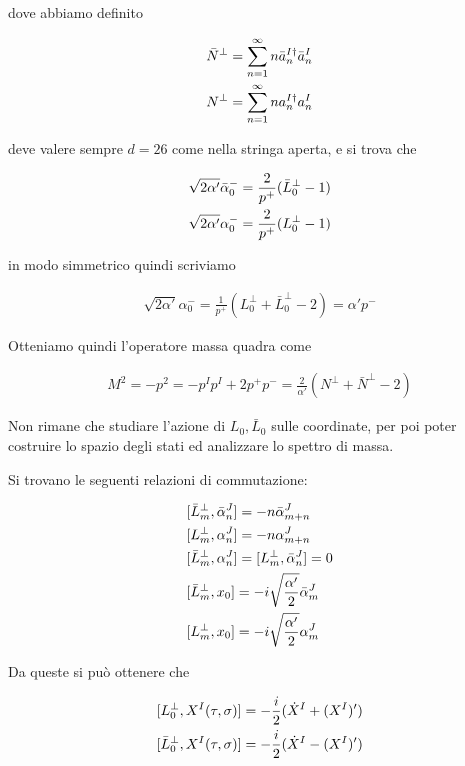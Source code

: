 \documentclass{report}
\begin{document}
dove abbiamo definito 

\begin{align}
    &\bar{N}^\perp = \sum_{n=1}^\infty n \bar{a}_n^{I\dagger}\bar{a}_n^I \notag \\
    &N^\perp = \sum_{n=1}^\infty n a_n^{I\dagger}a_n^I
\end{align}

deve valere sempre \(d=26\) come nella stringa aperta, e si trova che 

\begin{align}
    &\sqrt{2\alpha'}\bar{\alpha}_0 ^- = \frac{2}{p^+}(\bar{L}_0^\perp -1) \notag \\
    &\sqrt{2\alpha'}\alpha_0 ^- = \frac{2}{p^+}(L_0^\perp -1)
\end{align}

in modo simmetrico quindi scriviamo 

\begin{align}
    \sqrt{2\alpha'}\alpha^-_0 = \frac{1}{p^+}(L_0^\perp + \bar{L}_0^\perp -2) = \alpha' p^-
\end{align}

Otteniamo quindi l'operatore massa quadra come 

\begin{align}
    M^2 = -p^2 = -p^Ip^I +2p^+p^- = \frac{2}{\alpha'}(N^\perp + \bar{N}^\perp -2)
\end{align}

Non rimane che studiare l'azione di \(L_0, \bar{L}_0\) sulle coordinate, per poi poter costruire lo spazio degli stati ed analizzare lo spettro di massa. 

Si trovano le seguenti relazioni di commutazione: 

\begin{align}
    &[\bar{L}_m^\perp, \bar{\alpha}_n^J] = -n\bar{\alpha}^J_{m+n} \notag \\
    &[L_m^\perp, \alpha_n^J] = -n\alpha^J_{m+n} \notag \\
    &[\bar{L}_m^\perp, \alpha_n^J] = [L_m^\perp, \bar{\alpha}_n^J] = 0 \notag \\ 
    &[\bar{L}_m^\perp, x_0] = -i\sqrt{\frac{\alpha'}{2}}\bar{\alpha}^J_m \notag \\ 
    &[L_m^\perp, x_0] = -i\sqrt{\frac{\alpha'}{2}}\alpha^J_m
\end{align}

Da queste si può ottenere che 

\begin{align}
    &[L_0^\perp, X^I(\tau, \sigma)] = -\frac{i}{2}(\dot{X}^I + (X^I)') \notag \\
    &[\bar{L}_0^\perp, X^I(\tau, \sigma)] = -\frac{i}{2}(\dot{X}^I - (X^I)')
\end{align}
\end{document}

